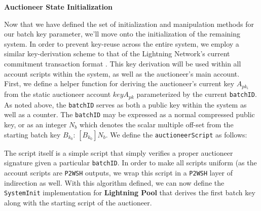 \documentclass[10pt,a4paper]{article}
\theoremstyle{definition}
\begin{document}
\begin{center}
    \textbf{Auctioneer State Initialization}
\end{center}

Now that we have defined the set of initialization and manipulation methods for
our batch key parameter, we'll move onto the initialization of the remaining
system. In order to prevent key-reuse across the entire system, we employ a
similar key-derivation scheme to that of the Lightning Network's current
commitment transaction format \cite{bolt3}. This key derivation will be used
within all account scripts within the system, as well as the auctioneer's main
account. \\

First, we define a helper function for deriving the auctioneer's current key
$A_{pk_i}$ from the static auctioneer account $key A_{pk}$ parameterized by the
current \texttt{batchID}. As noted above, the \texttt{batchID} serves as both a
public key within the system as well as a counter. The \texttt{batchID} may be
expressed as a normal compressed public key, or as an integer $N_{b}$ which
denotes the scalar multiple off-set from the starting batch key $B_{k_0}$:
$[B_{k_0}]N_{b}$. We define the \texttt{auctioneerScript} as follows: 

\begin{pcvstack}[boxed,center, space=1em]
\end{pcvstack}

The script itself is a simple script that simply verifies a proper auctioneer
signature given a particular \texttt{batchID}. In order to make all scripts
uniform (as the account scripts are \texttt{P2WSH} outputs, we wrap this script
in a \texttt{P2WSH} layer of indirection as well. With this algorithm defined,
we can now define the \texttt{SystemInit} implementation for \textbf{Lightning
Pool} that derives the first batch key along with the starting script of the
auctioneer. \\

\begin{pcvstack}[boxed,center, space=1em]
\end{pcvstack}
\end{document}
